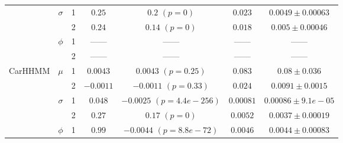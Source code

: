 \documentclass[12pt]{TD-CJS}
\begin{document}
{\begin{tabular}{ccccccc}
                            & \multirow{2}{*}{$\sigma$}     & 1                                & $0.25$                         & $0.2$ $(p=0)$          & $0.023$                             & $0.0049 \pm 0.00063$                             \\
                            &                               & 2                                & $0.24$                         & $0.14$ $(p=0)$          & $0.018$                             & $0.005 \pm 0.00046$                             \\ 
                            & \multirow{2}{*}{$\phi$}       & 1                                & ------                         & ------                     & ------                             & ------                                      \\
                            &                               & 2                                & ------                         & ------                     & ------                             & ------                                      \\ \hline
\multirow{6}{*}{CarHHMM}    & \multirow{2}{*}{$\mu$}        & 1                                & $0.0043$                         & $0.0043$ $(p=0.25)$          & $0.083$                             & $0.08 \pm 0.036$                             \\
                            &                               & 2                                & $-0.0011$                         & $-0.0011$ $(p=0.33)$          & $0.024$                             & $0.0091 \pm 0.0015$                             \\
                            & \multirow{2}{*}{$\sigma$}     & 1                                & $0.048$                         & $-0.0025$ $(p=4.4e-256)$          & $0.00081$                             & $0.00086 \pm 9.1e-05$                             \\
                            &                               & 2                                & $0.27$                         & $0.17$ $(p=0)$          & $0.0052$                             & $0.0037 \pm 0.00019$                             \\ 
                            & \multirow{2}{*}{$\phi$}       & 1                                & $0.99$                         & $-0.0044$ $(p=8.8e-72)$          & $0.0046$                             & $0.0044 \pm 0.00083$                             \\

\end{tabular}}
\end{document}
